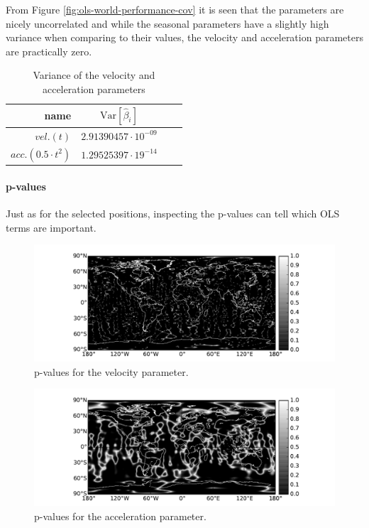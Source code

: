 From Figure \ref{fig:ols-world-performance-cov} it is seen that the parameters are nicely uncorrelated and while the seasonal parameters have a slightly high variance when comparing to their values, the velocity and acceleration parameters are practically zero.
\begin{table}[H]
\centering
\begin{tabular}{r|c c c}
	name & $\mathrm{Var}[\hat{\beta}_i]$ \\ \hline
	$vel. (t)$ & $2.91390457 \cdot 10^{-09}$  \\
	$acc. (0.5 \cdot t^2)$ & $1.29525397 \cdot 19^{-14}$
\end{tabular}
\caption{Variance of the velocity and acceleration parameters}
\end{table}

\paragraph{p-values} Just as for the selected positions, inspecting the p-values can tell which OLS terms are important.

\begin{figure}[H]
	\centering
	\includegraphics[width=\textwidth]{figures/ols-world-diagnostics-pvalue-1}
	\caption{p-values for the velocity parameter.}
	\label{fig:ols-world-diagnostics-pvalue-1}
\end{figure}

\begin{figure}[H]
	\centering
	\includegraphics[width=\textwidth]{figures/ols-world-diagnostics-pvalue-2}
	\caption{p-values for the acceleration parameter.}
	\label{fig:ols-world-diagnostics-pvalue-2}
\end{figure}

